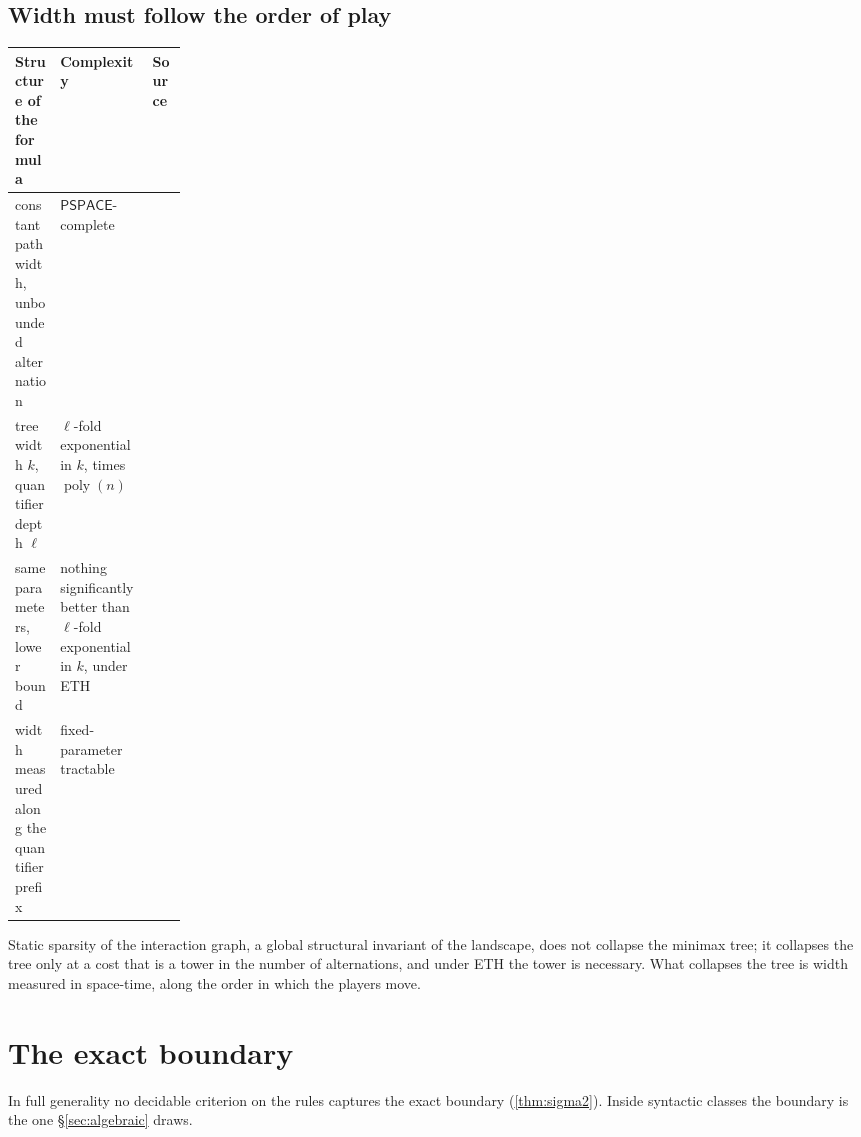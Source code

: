 \documentclass[11pt]{amsart}
\theoremstyle{plain}
\theoremstyle{definition}
\theoremstyle{remark}
\numberwithin{equation}{section}
\newcommand{\poly}{\operatorname{poly}}
\newcommand{\cls}[1]{\mathsf{#1}}
\newcommand{\PSPACE}{\cls{PSPACE}}
\begin{document}
\subsection{Width must follow the order of play}\label{ssec:width}
\begin{center}\small
\begin{tabularx}{\linewidth}{@{}>{\raggedright\arraybackslash}X>{\raggedright\arraybackslash}X>{\raggedright\arraybackslash}p{0.2\linewidth}@{}}
\toprule
Structure of the formula & Complexity & Source\\ \midrule
constant pathwidth, unbounded alternation & $\PSPACE$-complete & \cite{AtseriasOliva}\\
treewidth $k$, quantifier depth $\ell$ & $\ell$-fold exponential in $k$, times $\poly(n)$ & \cite{Chen04}\\
same parameters, lower bound & nothing significantly better than $\ell$-fold exponential in $k$, under ETH & \cite{FHP}\\
width measured along the quantifier prefix & fixed-parameter tractable & \cite{EGO,AtseriasOliva}\\
\bottomrule
\end{tabularx}
\end{center}
Static sparsity of the interaction graph, a global structural invariant of the landscape, does not collapse the minimax tree; it collapses the tree only at a cost that is a tower in the number of alternations, and under ETH the tower is necessary. What collapses the tree is width measured in space-time, along the order in which the players move.

\section{The exact boundary}\label{sec:boundary}

In full generality no decidable criterion on the rules captures the exact boundary (\cref{thm:sigma2}). Inside syntactic classes the boundary is the one \S\ref{sec:algebraic} draws.
\end{document}
